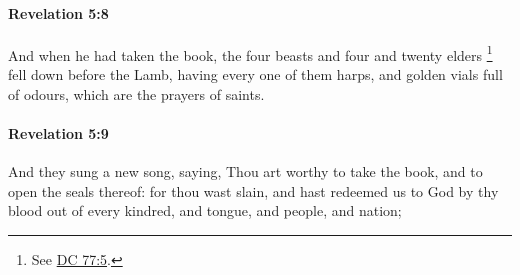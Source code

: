 		\paragraph{Revelation 5:8} %
			\label{REVELATIONNT-5-8}

			And when he had taken the book, the four beasts and four and twenty elders%
				\footnote{%
					See \hyperref[DC77-5]{DC 77:5}.
					}
			fell down before the Lamb, having every one of them harps, and golden vials full of odours, which are the prayers of saints.

			\begin{framed}
			\scriptsize
				\begin{compactdesc}
					\item[SBLG] 
				\end{compactdesc}
			\end{framed}

		\paragraph{Revelation 5:9} %
			\label{REVELATIONNT-5-9}

			And they sung a new song, saying, Thou art worthy to take the book, and to open the seals thereof: for thou wast slain, and hast redeemed us to God by thy blood out of every kindred, and tongue, and people, and nation;

